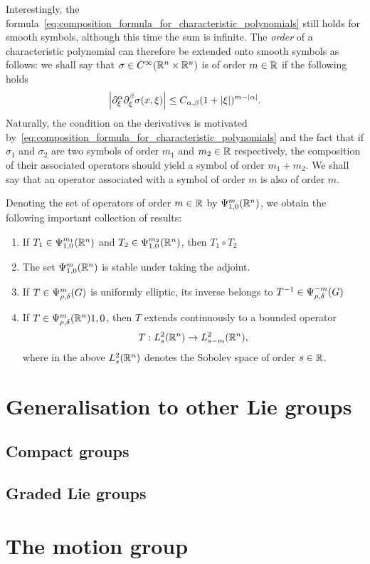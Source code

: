 Interestingly, the formula~\eqref{eq:composition_formula_for_characteristic_polynomials} still holds for smooth symbols,
although this time the sum is infinite.
The \emph{order} of a characteristic polynomial can therefore be extended onto smooth symbols as follows:
we shall say that $\sigma \in \SmoothFunctions {\R^n \times \R^n}$ is of order $m \in \R$
if the following holds
\begin{align*}
    \abs {\iD{\xi^\alpha, \xi^\beta} \sigma(x, \xi)} \leq C_{\alpha, \beta} (1 + \abs \xi)^{m - \abs \alpha}.
\end{align*}
Naturally, the condition on the derivatives is motivated by~\eqref{eq:composition_formula_for_characteristic_polynomials} and the fact that
if $\sigma_1$ and $\sigma_2$ are two symbols of order $m_1$ and $m_2 \in \R$ respectively,
the composition of their associated operators should yield a symbol of order $m_1 + m_2$.
We shall say that an operator associated with a symbol of order $m$ is also of order $m$.

Denoting the set of operators of order $m \in \R$ by $\OperatorClass [\R^n] m {1, 0}$,
we obtain the following important collection of results:
\begin{enumerate}
    \item
        If $T_1 \in \OperatorClass [\R^n] {m_1} {1, 0}$
        and $T_2 \in \OperatorClass [\R^n] {m_2} {1, 0}$,
        then $T_1 \circ T_2$
    \item
        The set $\OperatorClass [\R^n] m {1, 0}$ is stable under taking the adjoint.
    \item
        If $T \in \OperatorClass m {\rho, \delta}$ is uniformly elliptic,
        its inverse belongs to $T^{-1} \in \OperatorClass {-m} {\rho, \delta}$
    \item
        If $T \in \OperatorClass [\R^n] m {\rho, \delta} {1, 0}$,
        then $T$ extends continuously to a bounded operator
        \begin{align*}
            T : \Sobolev [\R^n] s \to \Sobolev [\R^n] {s - m},
        \end{align*}
        where in the above $\Sobolev [\R^n] s$ denotes the Sobolev space of order $s \in \R$.
\end{enumerate}

\section{Generalisation to other Lie groups}


\subsection{Compact groups}

\subsection{Graded Lie groups}

\section{The motion group}
